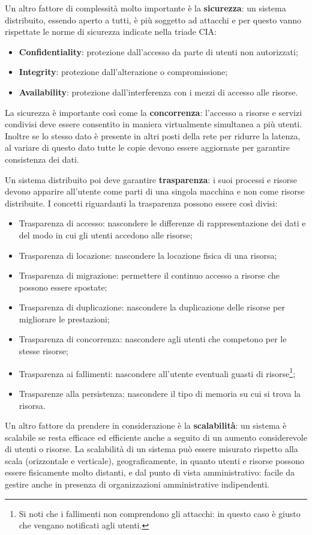 Un altro fattore di complessità molto importante è la \textbf{sicurezza}: un sistema distribuito, essendo aperto a tutti, è più soggetto ad attacchi e per questo vanno rispettate le norme di sicurezza indicate nella triade CIA:
\begin{itemize}
    \item \textbf{Confidentiality}: protezione dall'accesso da parte di utenti non autorizzati;
    \item \textbf{Integrity}: protezione dall'alterazione o compromissione;
    \item \textbf{Availability}: protezione dall'interferenza con i mezzi di accesso alle risorse.
\end{itemize}
La sicurezza è importante così come la \textbf{concorrenza}: l'accesso a risorse e servizi condivisi deve essere consentito in maniera virtualmente simultanea a più utenti. Inoltre se lo stesso dato è presente in altri posti della rete per ridurre la latenza, al variare di questo dato tutte le copie devono essere aggiornate per garantire consistenza dei dati.

Un sistema distribuito poi deve garantire \textbf{trasparenza}: i suoi processi e risorse devono apparire all'utente come parti di una singola macchina e non come risorse distribuite. I concetti riguardanti la trasparenza possono essere così divisi:
\begin{itemize}
    \item Trasparenza di accesso: nascondere le differenze di rappresentazione dei dati e del modo in cui gli utenti accedono alle risorse;
    \item Trasparenza di locazione: nascondere la locazione fisica di una risorsa;
    \item Trasparenza di migrazione: permettere il continuo accesso a risorse che possono essere spostate;
    \item Trasparenza di duplicazione: nascondere la duplicazione delle risorse per migliorare le prestazioni;
    \item Trasparenza di concorrenza: nascondere agli utenti che competono per le stesse risorse;
    \item Trasparenza ai fallimenti: nascondere all'utente eventuali guasti di risorse\footnote{Si noti che i fallimenti non comprendono gli attacchi: in questo caso è giusto che vengano notificati agli utenti.};
    \item Trasparenze alla persistenza: nascondere il tipo di memoria su cui si trova la risorsa.
\end{itemize}
Un altro fattore da prendere in considerazione è la \textbf{scalabilità}: un sistema è scalabile se resta efficace ed efficiente anche a seguito di un aumento considerevole di utenti o risorse. La scalabilità di un sistema può essere misurato rispetto alla scala (orizzontale e verticale), geograficamente, in quanto utenti e risorse possono essere fisicamente molto distanti, e dal punto di vista amministrativo: facile da gestire anche in presenza di organizzazioni amministrative indipendenti.

